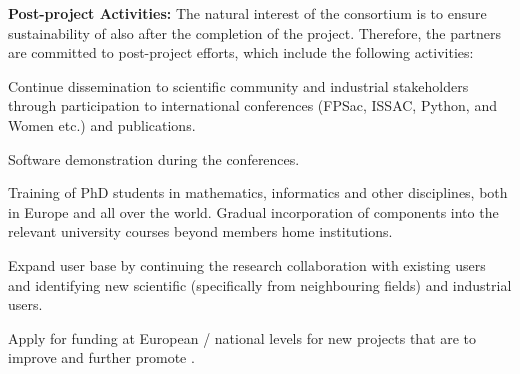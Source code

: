 
{\bf Post-project Activities:} The natural interest of the consortium is to ensure sustainability of \TheProject also after the completion of the project. Therefore, the partners are committed to post-project efforts, which include the following activities: 
\begin{compactenum}
\item Continue dissemination to scientific community and industrial stakeholders through participation to international conferences (FPSac, ISSAC, Python, \Sage and Women etc.) and publications.
\item Software demonstration during the conferences.
\item Training of  PhD students in mathematics, informatics and other disciplines, both in Europe and all over the world. Gradual incorporation of \TheProject components into the relevant university courses beyond \TheProject members home institutions.
\item Expand \TheProject user base by continuing the research collaboration with existing users and  identifying new scientific (specifically from neighbouring fields) and industrial users.
\item Apply for funding at European / national levels for new projects that are to improve and further promote \TheProject.
\end{compactenum}

